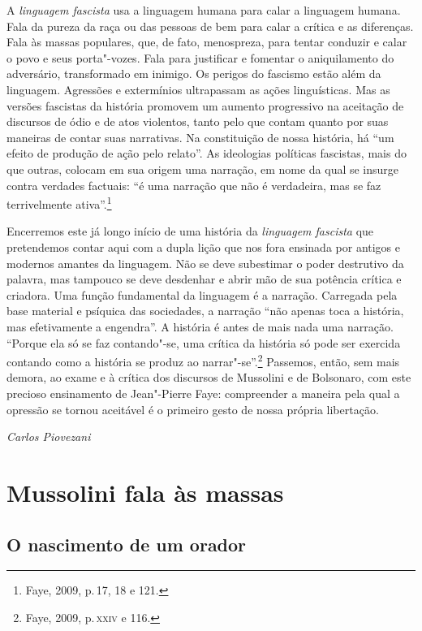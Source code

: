 A \emph{linguagem fascista} usa a linguagem humana para calar a
linguagem humana. Fala da pureza da raça ou das pessoas de bem para
calar a crítica e as diferenças. Fala às massas populares, que, de fato,
menospreza, para tentar conduzir e calar o povo e seus porta"-vozes. Fala
para justificar e fomentar o aniquilamento do adversário, transformado
em inimigo. Os perigos do fascismo estão além da linguagem. Agressões e
extermínios ultrapassam as ações linguísticas. Mas as versões fascistas
da história promovem um aumento progressivo na aceitação de discursos de
ódio e de atos violentos, tanto pelo que contam quanto por suas maneiras
de contar suas narrativas. Na constituição de nossa história, há ``um
efeito de produção de ação pelo relato''. As ideologias políticas
fascistas, mais do que outras, colocam em sua origem uma narração, em
nome da qual se insurge contra verdades factuais: ``é uma narração que
não é verdadeira, mas se faz terrivelmente ativa''.\footnote{Faye, 2009,
  p.\,17, 18 e 121.}

Encerremos este já longo início de uma história da
\emph{linguagem fascista} que pretendemos contar aqui com a
dupla lição que nos fora ensinada por antigos e modernos amantes da
linguagem. Não se deve subestimar o poder destrutivo da palavra, mas
tampouco se deve desdenhar e abrir mão de sua potência crítica e
criadora. Uma função fundamental da linguagem é a narração. Carregada
pela base material e psíquica das sociedades, a narração ``não apenas
toca a história, mas efetivamente a engendra''. A história é antes de
mais nada uma narração. ``Porque ela só se faz contando"-se, uma crítica
da história só pode ser exercida contando como a história se produz ao %
narrar"-se''.\footnote{Faye, 2009, p.\,\textsc{xxiv} e 116.} Passemos, então, sem
mais demora, ao exame e à crítica dos discursos de Mussolini e de
Bolsonaro, com este precioso ensinamento de Jean"-Pierre Faye:
compreender a maneira pela qual a opressão se tornou aceitável é o
primeiro gesto de nossa própria libertação.

\bigskip
\hfill\textit{Carlos Piovezani}


\chapter[Mussolini fala às massas, \emph{por Emilio Gentile}]{Mussolini fala às massas }

\section{O nascimento de um orador}

